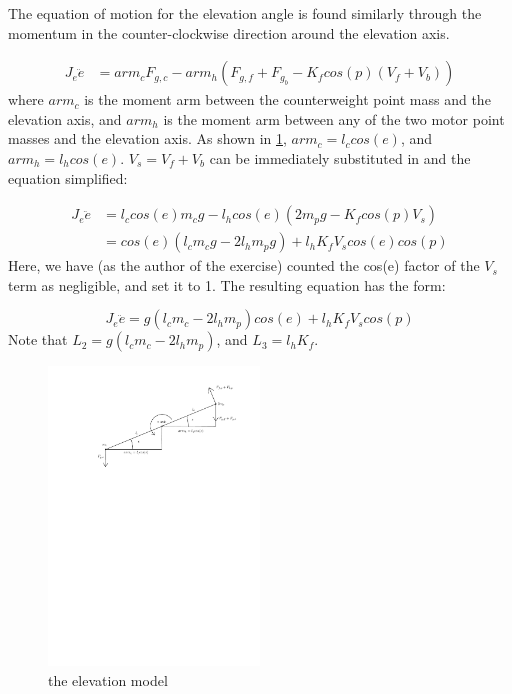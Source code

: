 The equation of motion for the elevation angle is found similarly
through the momentum in the counter-clockwise direction around the
elevation axis.

\begin{align*}
  J_e\ddot{e} &= arm_cF_{g,c} - arm_h(F_{g,f}+F_{g_b} - K_fcos(p)(V_f + V_b))
\end{align*}
where $arm_c$ is the moment arm between the counterweight point mass
and the elevation axis, and $arm_h$ is the moment arm between any of
the two motor point masses and the elevation axis. As shown in
\cref{fig:elevation_model}, $arm_c = l_ccos(e)$, and $arm_h =
l_hcos(e)$.  $V_s = V_f + V_b$ can be immediately substituted in and the equation simplified:

\begin{align*}
  J_e\ddot{e} &= l_ccos(e)m_cg - l_hcos(e)(2m_pg - K_fcos(p)V_s) \\
              &= cos(e)(l_cm_cg - 2l_hm_pg) + l_hK_fV_scos(e)cos(p)
\end{align*}
Here, we have (as the author of the exercise) counted the cos(e)
factor of the $V_s$ term as negligible, and set it to 1.  The resulting equation has the form:

\begin{equation}
\label{eq:elevation EoM}
  J_e\ddot{e} = g(l_cm_c - 2l_hm_p)cos(e) + l_hK_fV_scos(p)
\end{equation}
Note that $L_2 = g(l_cm_c-2l_hm_p)$, and $L_3 = l_hK_f$.

\begin{figure}[H]
  \caption{the elevation model}
  \label{fig:elevation_model}
  \includegraphics[width=0.5\textwidth]{images/elevation_model}
\end{figure}

